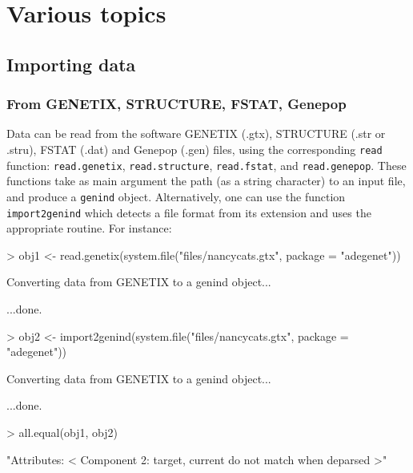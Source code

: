 \documentclass{article}
\begin{document}
\section{Various topics}


\subsection{Importing data}


\subsubsection{From GENETIX, STRUCTURE, FSTAT, Genepop}

Data can be read from the software GENETIX (.gtx), STRUCTURE (.str or
.stru), FSTAT (.dat) and Genepop (.gen) files, using the corresponding
\texttt{read} function: \texttt{read.genetix},  \texttt{read.structure},
\texttt{read.fstat}, and  \texttt{read.genepop}.
These functions take as main argument the path (as a string character) to an input file, and produce a \texttt{genind} object.
Alternatively, one can use the function \texttt{import2genind} which detects a file format from its extension and uses the appropriate routine.
For instance:
\begin{Schunk}
\begin{Sinput}
> obj1 <- read.genetix(system.file("files/nancycats.gtx", package = "adegenet"))
\end{Sinput}
\begin{Soutput}
 Converting data from GENETIX to a genind object... 

...done.
\end{Soutput}
\begin{Sinput}
> obj2 <- import2genind(system.file("files/nancycats.gtx", package = "adegenet"))
\end{Sinput}
\begin{Soutput}
 Converting data from GENETIX to a genind object... 

...done.
\end{Soutput}
\begin{Sinput}
> all.equal(obj1, obj2)
\end{Sinput}
\begin{Soutput}
[1] "Attributes: < Component 2: target, current do not match when deparsed >"
\end{Soutput}
\end{Schunk}
\end{document}
